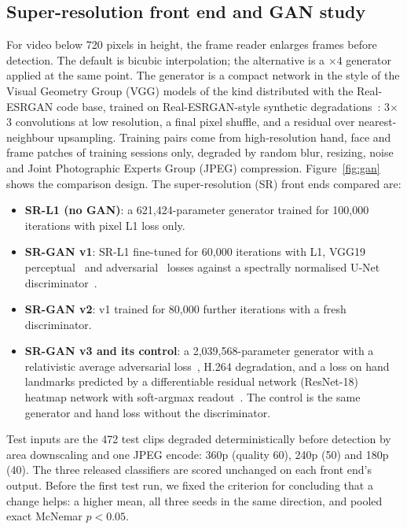 \documentclass[pdflatex,sn-mathphys-num,twocolumn]{sn-jnl}
\theoremstyle{thmstyleone}%
\begin{document}
\subsection{Super-resolution front end and GAN study}\label{sec:method:sr}
For video below 720 pixels in height, the frame reader enlarges frames before detection. The default is bicubic interpolation; the alternative is a $\times4$ generator applied at the same point. The generator is a compact network in the style of the Visual Geometry Group (VGG) models of the kind distributed with the Real-ESRGAN code base, trained on Real-ESRGAN-style synthetic degradations~\cite{wang2021realesrgan}: 3$\times$3 convolutions at low resolution, a final pixel shuffle, and a residual over nearest-neighbour upsampling. Training pairs come from high-resolution hand, face and frame patches of training sessions only, degraded by random blur, resizing, noise and Joint Photographic Experts Group (JPEG) compression. Figure~\ref{fig:gan} shows the comparison design. The super-resolution (SR) front ends compared are:
\begin{itemize}
\item \textbf{SR-L1 (no GAN)}: a 621,424-parameter generator trained for 100,000 iterations with pixel L1 loss only.
\item \textbf{SR-GAN v1}: SR-L1 fine-tuned for 60,000 iterations with L1, VGG19 perceptual~\cite{johnson2016perceptual,simonyan2015vgg} and adversarial~\cite{goodfellow2014gan} losses against a spectrally normalised U-Net discriminator~\cite{schonfeld2020unetd,miyato2018sn}.
\item \textbf{SR-GAN v2}: v1 trained for 80,000 further iterations with a fresh discriminator.
\item \textbf{SR-GAN v3 and its control}: a 2,039,568-parameter generator with a relativistic average adversarial loss~\cite{jolicoeur2019ragan}, H.264 degradation, and a loss on hand landmarks predicted by a differentiable residual network (ResNet-18)~\cite{he2016resnet} heatmap network with soft-argmax readout~\cite{sun2018integral}. The control is the same generator and hand loss without the discriminator.
\end{itemize}
Test inputs are the 472 test clips degraded deterministically before detection by area downscaling and one JPEG encode: 360p (quality 60), 240p (50) and 180p (40). The three released classifiers are scored unchanged on each front end's output. Before the first test run, we fixed the criterion for concluding that a change helps: a higher mean, all three seeds in the same direction, and pooled exact McNemar $p<0.05$.
\end{document}
